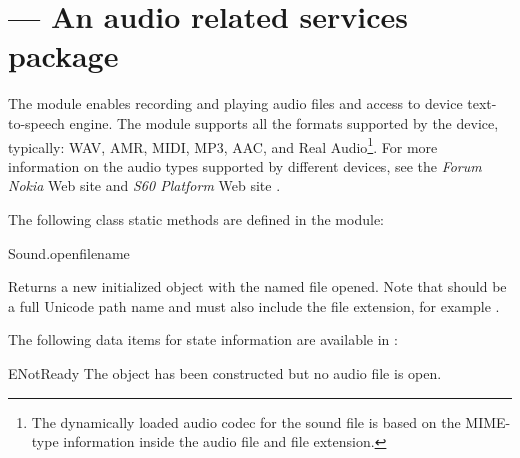 %
%
%

\section{ ---
  An audio related services package}
\label{sec:audio}


The  module enables recording and playing audio files and access 
to device text-to-speech engine. The  module supports all the 
formats supported by the device, typically: WAV, AMR, MIDI, MP3, AAC, and Real 
Audio\footnote{The dynamically loaded audio codec for the sound file is based on 
the MIME-type information inside the audio file and file extension.}. For more 
information on the audio types supported by different devices, see the 
\textit{Forum Nokia} Web site \cite{S60AudioVideo} and \textit{S60 Platform} Web 
site \cite{S60Developers}. 

The following  class static methods are defined in the 
 module:

\begin{funcdesc}{Sound.open}{filename}

Returns a new initialized  object with the named file opened. 
Note that  should be a full Unicode path name and 
must also include the file extension, for example .
\end{funcdesc}

The following data items for state information are available in :

\begin{datadesc}{ENotReady}
The  object has been constructed but no audio file is open.
\end{datadesc}

